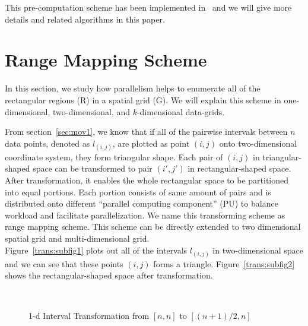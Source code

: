 \documentclass[AMA,LATO1COL]{WileyNJD-v2}
\begin{document}
This pre-computation scheme has been implemented in~\cite{apweb} and we will give more details and related algorithms in this paper.

\section {Range Mapping Scheme} \label{RMS}
In this section, we study how parallelism helps to enumerate all of the rectangular regions (R) in a spatial grid (G). We will explain this scheme in one-dimensional, two-dimensional, and $k$-dimensional data-grids.

From section~\ref{sec:mov1}, we know that if all of the pairwise intervals between $n$ data points, denoted as $l_{(i,j)}$, are plotted as point $(i,j)$ onto two-dimensional coordinate system, they form triangular shape. Each pair of $(i,j)$ in triangular-shaped space can be transformed to pair $(i',j')$ in rectangular-shaped space. After transformation, it enables the whole rectangular space to be partitioned into equal portions. Each portion consists of same amount of pairs and is distributed onto different ``parallel computing component'' (PU) to balance workload and facilitate parallelization. We name this transforming scheme as range mapping scheme. This scheme can be directly extended to two dimensional spatial grid and multi-dimensional grid.\\
Figure~\ref{trans:subfig1} plots out all of the intervals $l_{(i,j)}$ in two-dimensional space and we can see that these points $(i,j)$ forms a triangle. Figure~\ref{trans:subfig2} shows the rectangular-shaped space after transformation.

\begin{figure}[h]
\centering
{}
~~
\caption{1-d Interval Transformation from $[n,n]$ to $[(n+1)/2,n]$}\label{modelBF}
\end{figure}
\end{document}

